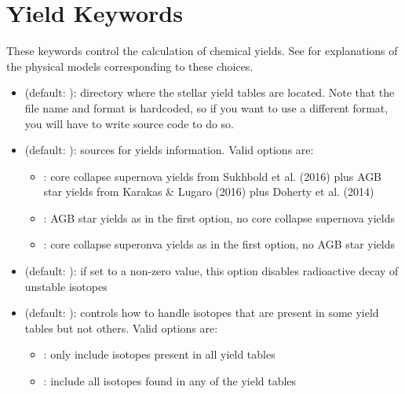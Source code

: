 \documentclass[letterpaper,10pt,english]{sphinxmanual}
\begin{document}
\section{Yield Keywords}
\label{\detokenize{parameters:yield-keywords}}\label{\detokenize{parameters:ssec-yield-keywords}}
These keywords control the calculation of chemical yields. See
{\hyperref[\detokenize{intro:ssec-yields}]{}} for explanations of the physical models
corresponding to these choices.
\begin{itemize}
\item {} 
 (default: ): directory where the
stellar yield tables are located. Note that the file name and
format is hardcoded, so if you want to use a different format,
you will have to write source code to do so.

\item {} 
 (default: ):
sources for yields information. Valid options are:
\begin{itemize}
\item {} 
: core collapse supernova yields
from Sukhbold et al. (2016) plus AGB star yields from Karakas \&
Lugaro (2016) plus Doherty et al. (2014)

\item {} 
: AGB star yields as in the first option,
no core collapse supernova yields

\item {} 
: core collapse superonva yields as in the first
option, no AGB star yields

\end{itemize}

\item {} 
 (default: ): if set to a non-zero value,
this option disables radioactive decay of unstable isotopes

\item {} 
 (default: ): controls how to
handle isotopes that are present in some yield tables but not
others. Valid options are:
\begin{itemize}
\item {} 
: only include isotopes present in all yield
tables

\item {} 
: include all isotopes found in any of the yield tables

\end{itemize}

\end{itemize}
\end{document}
